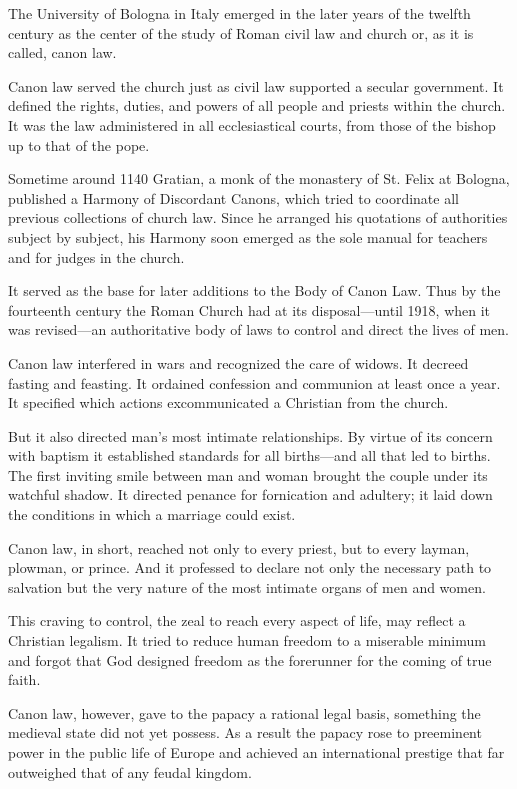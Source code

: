The University of Bologna in Italy emerged in the later years of the twelfth century as the center
of the study of Roman civil law and church or, as it is called, canon law.

Canon law served the church just as civil law supported a secular government. It defined the rights,
duties, and powers of all people and priests within the church. It was the law administered in all
ecclesiastical courts, from those of the bishop up to that of the pope.

Sometime around 1140 Gratian, a monk of the monastery of St. Felix at Bologna, published a Harmony
of Discordant Canons, which tried to coordinate all previous collections of church law. Since he
arranged his quotations of authorities subject by subject, his Harmony soon emerged as the sole
manual for teachers and for judges in the church.

It served as the base for later additions to the Body of Canon Law. Thus by the fourteenth century
the Roman Church had at its disposal—until 1918, when it was revised—an authoritative body of laws
to control and direct the lives of men.

Canon law interfered in wars and recognized the care of widows. It decreed fasting and feasting. It
ordained confession and communion at least once a year. It specified which actions excommunicated a
Christian from the church.

But it also directed man’s most intimate relationships. By virtue of its concern with baptism it
established standards for all births—and all that led to births. The first inviting smile between
man and woman brought the couple under its watchful shadow. It directed penance for fornication and
adultery; it laid down the conditions in which a marriage could exist.

Canon law, in short, reached not only to every priest, but to every layman, plowman, or prince. And
it professed to declare not only the necessary path to salvation but the very nature of the most
intimate organs of men and women.

This craving to control, the zeal to reach every aspect of life, may reflect a Christian legalism.
It tried to reduce human freedom to a miserable minimum and forgot that God designed freedom as the
forerunner for the coming of true faith.

Canon law, however, gave to the papacy a rational legal basis, something the medieval state did not
yet possess. As a result the papacy rose to preeminent power in the public life of Europe and
achieved an international prestige that far outweighed that of any feudal kingdom.


